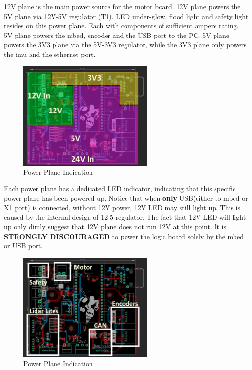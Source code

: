 \documentclass[letterpaper, 12pt]{article}
\begin{document}
12V plane is the main power source for the motor board. 12V plane powers the 5V plane via
12V-5V regulator (T1). LED under-glow, flood light and safety light resides on this power
plane. Each with components of sufficient ampere rating. \\

5V plane powers the mbed, encoder and the USB port to the PC. 5V plane powers the 3V3 plane
via the 5V-3V3 regulator, while the 3V3 plane only powers the imu and the ethernet port. \\

\begin{figure}[h]
\centering
\includegraphics[width=0.6\textwidth]{img/pwr_plane.png}
\caption{Power Plane Indication} \label{fig:pwr_plane}
\end{figure}

Each power plane has a dedicated LED indicator, indicating that this specific power plane
has been powered up. Notice that when \textbf{only} USB(either to mbed or X1 port) is connected,
without 12V power, 12V LED may still light up. This is caused by the internal design of 12-5 regulator.
The fact that 12V LED will light up only dimly suggest that 12V plane does not run 12V at this point.
It is \textbf{STRONGLY DISCOURAGED} to power the logic board solely by the mbed or USB port.


\begin{figure}[h]
  \centering
  \includegraphics[width=0.6\textwidth]{img/conns.png}
  \caption{Power Plane Indication} \label{fig:conns}
  \end{figure}
\end{document}
